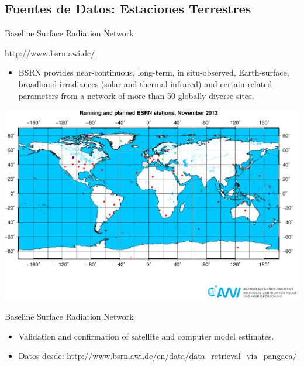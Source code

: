 \documentclass[xcolor={usenames,svgnames,dvipsnames}]{beamer}
\begin{document}
\subsection{Fuentes de Datos: Estaciones Terrestres}
\label{sec-6-5}

\begin{frame}[label=sec-6-5-1]{Baseline Surface Radiation Network}
\begin{block}{\url{http://www.bsrn.awi.de/}}
\begin{itemize}
\item BSRN provides near-continuous, long-term, in situ-observed,
Earth-surface, broadband irradiances (solar and thermal infrared)
and certain related parameters from a network of more than 50
globally diverse sites.
\end{itemize}

\begin{center}
\includegraphics[height=0.5\textheight]{../figs/BSRN.png}
\end{center}
\end{block}
\end{frame}

\begin{frame}[label=sec-6-5-2]{Baseline Surface Radiation Network}
\begin{itemize}
\item Validation and confirmation of satellite and computer model
estimates.

\item Datos desde:  \url{http://www.bsrn.awi.de/en/data/data_retrieval_via_pangaea/}
\end{itemize}
\end{frame}
\end{document}
